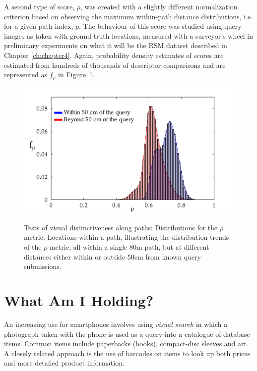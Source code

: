 A second type of score, $\rho$, was created with a slightly different normalization criterion based on observing the maximum within-path distance distributions, i.e. for a given path index, $p$.  The behaviour of this score was studied using query images as taken with ground-truth locations, measured with a surveyor's wheel in preliminary experiments on what it will be the RSM dataset described in Chapter \ref{ch:chapter4}. Again, probability density estimates of scores are estimated from hundreds of thousands of descriptor comparisons and are represented as $f_\rho$ in Figure~\ref{fig:rhoDistribution}.


\begin{figure}[ht]
\centering
{\includegraphics[width=\linewidth]{./gfx/Chapter02/C5distributions_no_smoothingWithSmoothedHistograms-latex.pdf}}
\caption{Tests of visual distinctiveness along paths: Distributions for the $\rho$ metric. Locations within a path, illustrating the distribution trends of the $\rho$-metric, all within a single 80m path, but at different distances either within or outside 50cm from known query submissions.}        
\label{fig:rhoDistribution}
\end{figure}



\section{What Am I Holding?}

An increasing use for smartphones involves using \textit{visual search} in which a photograph taken with the phone is used as a query into a catalogue of database items.  Common items include paperbacks (books), compact-disc sleeves and art.  A closely related approach is the use of barcodes on items to look up both prices and more detailed product information.  

